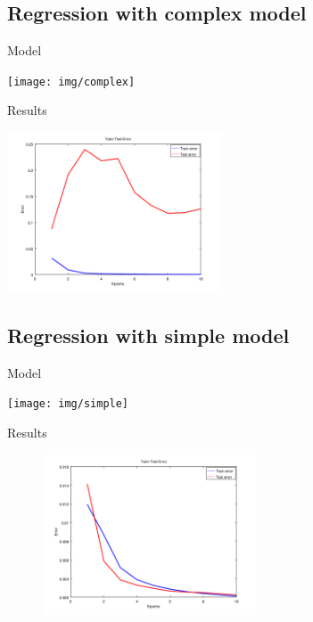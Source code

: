 \documentclass{beamer}
\begin{document}
\subsection{Regression with complex model}
\begin{frame}{Model}
	\begin{center}
		\hspace*{-0.7cm}
		\texttt{[image: img/complex]}
    \end{center}
\end{frame}

\begin{frame}{Results}
	\begin{center}
		\includegraphics[width=240px,height=180px]{img/train-test-100}
    \end{center}
\end{frame}


\subsection{Regression with simple model}
\begin{frame}{Model}
	\begin{center}
		\hspace*{-0.6cm}
		\texttt{[image: img/simple]}
    \end{center}
\end{frame}

\begin{frame}{Results}
\begin{figure}[h]
	\begin{center}
		\includegraphics[width=240px,height=180px]{img/small-network}
    \end{center}
\end{figure}

\end{frame}
\end{document}
